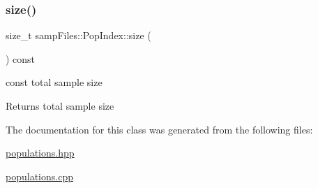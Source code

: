 \subsubsection{\texorpdfstring{size()}{size()}\hspace{0.1cm}{\footnotesize\ttfamily [2/2]}}
{\footnotesize\ttfamily size\+\_\+t samp\+Files\+::\+Pop\+Index\+::size (\begin{DoxyParamCaption}{ }\end{DoxyParamCaption}) const\hspace{0.3cm}{\ttfamily [inline]}}



{\ttfamily const} total sample size 

\begin{DoxyReturn}{Returns}
total sample size 
\end{DoxyReturn}


The documentation for this class was generated from the following files\+:\begin{DoxyCompactItemize}
\item 
\hyperlink{populations_8hpp}{populations.\+hpp}\item 
\hyperlink{populations_8cpp}{populations.\+cpp}\end{DoxyCompactItemize}
